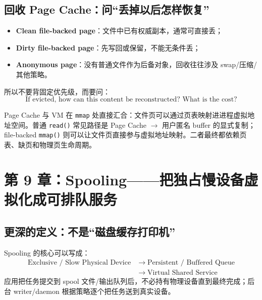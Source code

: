 \documentclass[11pt,a4paper]{ctexart}
\newcommand{\kw}[1]{\textbf{#1}}
\newcommand{\code}[1]{\texttt{#1}}
\newcommand{\arr}{\;\longrightarrow\;}
\begin{document}
\subsection{回收 Page Cache：问“丢掉以后怎样恢复”}
\begin{itemize}
  \item \kw{Clean file-backed page}：文件中已有权威副本，通常可直接丢；
  \item \kw{Dirty file-backed page}：先写回或保留，不能无条件丢；
  \item \kw{Anonymous page}：没有普通文件作为后备对象，回收往往涉及 swap/压缩/其他策略。
\end{itemize}
所以不要背固定优先级，而要问：
\[
\boxed{\text{If evicted, how can this content be reconstructed? What is the cost?}}
\]

\begin{bridge}[与虚拟内存专题的接口]
Page Cache 与 VM 在 \code{mmap} 处直接汇合：文件页可以通过页表映射进进程虚拟地址空间。普通 \code{read()} 常见路径是 Page Cache $\to$ 用户匿名 buffer 的显式复制；file-backed \code{mmap()} 则可以让文件页直接参与虚拟地址映射。二者最终都依赖页表、缺页和物理页生命周期。
\end{bridge}

\section{第 9 章：Spooling——把独占慢设备虚拟化成可排队服务}

\subsection{更深的定义：不是“磁盘缓存打印机”}
Spooling 的核心可以写成：
\[
\boxed{
\begin{aligned}
\text{Exclusive / Slow Physical Device}
&\arr
\text{Persistent / Buffered Queue}\\
&\arr
\text{Virtual Shared Service}
\end{aligned}
}
\]
应用把任务提交到 spool 文件/输出队列后，不必持有物理设备直到最终完成；后台 writer/daemon 根据策略逐个把任务送到真实设备。
\end{document}
